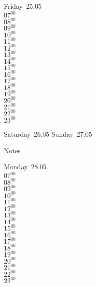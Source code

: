 \documentclass[11pt, a4paper]{book}\usepackage[]{graphicx}\usepackage[]{color}
\begin{document}
\begin{weekdaybox}
  Friday~25.05\\
  { 
  \vfill
  $07^{00}$\\
$08^{00}$\\
$09^{00}$\\
$10^{00}$\\
$11^{00}$\\
$12^{00}$\\
$13^{00}$\\
$14^{00}$\\
$15^{00}$\\
$16^{00}$\\
$17^{00}$\\
$18^{00}$\\
$19^{00}$\\
$20^{00}$\\
$21^{00}$\\
$22^{00}$\\
$23^{00}$\\
  }
\end{weekdaybox}
\begin{weekendbox}
  Saturday~26.05
  \tcblower
  Sunday~27.05
\end{weekendbox} %
\begin{notebox}
  Notes
\end{notebox}
\clearpage
\begin{headerbox}
\end{headerbox}
\begin{weekdaybox}
  Monday~28.05\\
  { 
  \vfill
  $07^{00}$\\
$08^{00}$\\
$09^{00}$\\
$10^{00}$\\
$11^{00}$\\
$12^{00}$\\
$13^{00}$\\
$14^{00}$\\
$15^{00}$\\
$16^{00}$\\
$17^{00}$\\
$18^{00}$\\
$19^{00}$\\
$20^{00}$\\
$21^{00}$\\
$22^{00}$\\
$23^{00}$\\
  }
\end{weekdaybox}
\end{document}
